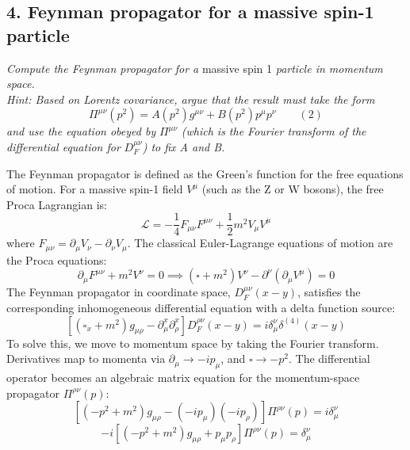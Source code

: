 \subsection*{4. Feynman propagator for a massive spin-1 particle}

\begin{center}
    \textit{Compute the Feynman propagator for a } massive spin 1 \textit{ particle in momentum space. \\
        Hint: Based on Lorentz covariance, argue that the result must take the form}
    \[
        \Pi^{\mu\nu}(p^2) = A(p^2) g^{\mu\nu} + B(p^2) p^\mu p^\nu \qquad (2)
    \]
    \textit{and use the equation obeyed by } $\Pi^{\mu\nu}$ \textit{ (which is the Fourier transform of the differential equation for } $D^{\mu\nu}_F$\textit{) to fix A and B.}
\end{center}

The Feynman propagator is defined as the Green's function for the free equations of motion. For a massive spin-1 field $V^\mu$ (such as the Z or W bosons), the free Proca Lagrangian is:
\[
    \mathcal{L} = -\frac{1}{4} F_{\mu\nu} F^{\mu\nu} + \frac{1}{2} m^2 V_\mu V^\mu
\]
where $F_{\mu\nu} = \partial_\mu V_\nu - \partial_\nu V_\mu$. The classical Euler-Lagrange equations of motion are the Proca equations:
\[
    \partial_\mu F^{\mu\nu} + m^2 V^\nu = 0 \implies (\square + m^2)V^\nu - \partial^\nu(\partial_\mu V^\mu) = 0
\]
The Feynman propagator in coordinate space, $D_F^{\mu\nu}(x-y)$, satisfies the corresponding inhomogeneous differential equation with a delta function source:
\[
    \left[ (\square_x + m^2)g_{\mu\rho} - \partial^x_\mu \partial^x_\rho \right] D_F^{\rho\nu}(x-y) = i \delta_\mu^\nu \delta^{(4)}(x-y)
\]
To solve this, we move to momentum space by taking the Fourier transform. Derivatives map to momenta via $\partial_\mu \to -ip_\mu$, and $\square \to -p^2$. The differential operator becomes an algebraic matrix equation for the momentum-space propagator $\Pi^{\rho\nu}(p)$:
\[
    \left[ (-p^2 + m^2)g_{\mu\rho} - (-ip_\mu)(-ip_\rho) \right] \Pi^{\rho\nu}(p) = i \delta_\mu^\nu
\]
\[
    -i \left[ (-p^2 + m^2)g_{\mu\rho} + p_\mu p_\rho \right] \Pi^{\rho\nu}(p) = \delta_\mu^\nu
\]


